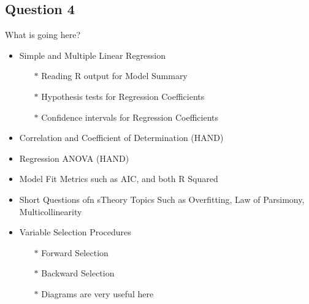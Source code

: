 \documentclass[a4paper,12pt]{article}
\begin{document}
\subsection*{Question 4}
\begin{framed}
	What is going here?
	\begin{itemize}
		\item Simple and Multiple Linear Regression
		\begin{itemize}
			\item[$\ast$]  Reading R output for Model Summary
			\item[$\ast$]  Hypothesis tests for Regression Coefficients
			\item[$\ast$]  Confidence intervals for Regression Coefficients
		\end{itemize}
		\item Correlation and Coefficient of Determination (HAND)
		\item Regression ANOVA (HAND)
				\item Model Fit Metrics such as AIC, and both R Squared
		\item Short Questions ofn sTheory Topics Such as Overfitting, Law of Parsimony, Multicollinearity
		\item Variable Selection Procedures
		\begin{itemize}
				\item[$\ast$] Forward Selection
				\item[$\ast$] Backward Selection
					\item[$\ast$] Diagrams are very useful here
		\end{itemize}
	\end{itemize}
\end{framed}



\newpage
\end{document}
